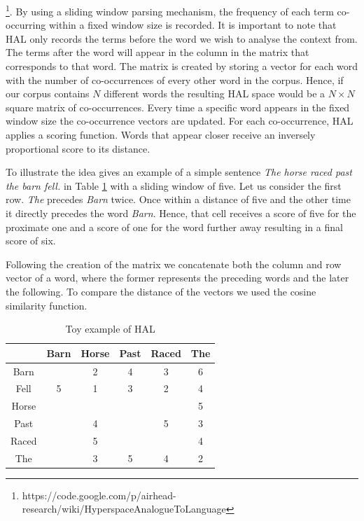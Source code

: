  \footnote{https://code.google.com/p/airhead-research/wiki/HyperspaceAnalogueToLanguage}. By using a sliding window parsing mechanism, the frequency of each term co-occurring within a fixed window size is recorded.  It is important to note that HAL only records the terms before the word we wish to analyse the context from. The terms after the word will appear in the column in the matrix that corresponds to that word.  The matrix is created by storing a vector for each word with the number of co-occurrences of every other word in the corpus. Hence, if our corpus contains $N$ different words the resulting HAL space would be a $N \times N$ square matrix of co-occurrences. Every time a specific word appears in the fixed window size the co-occurrence vectors are updated. For each co-occurrence, HAL applies a scoring function. Words that appear closer receive an inversely proportional score to its distance.

 To illustrate the idea \cite{burgess98} gives an example of a simple sentence \emph {The horse raced past the barn fell.} in Table \ref{tab:halex} with a sliding window of five. Let us consider the first row.  \emph{The} precedes \emph{Barn} twice. Once within a distance of five and the other time it directly precedes the word  \emph{Barn}. Hence, that cell receives a score of five for the proximate one and a score of one for the word further away resulting in a final score of six. 

Following the creation of the matrix we concatenate both the column and row vector of a word, where the former represents the preceding words and the later the following. To compare the distance of the vectors we used the cosine similarity function. 


\begin{table}[H]
\centering
\begin{tabular}{ c c c c c c} \toprule
  & Barn & Horse &  Past & Raced & The \\ 
  \hline
 Barn &  & 2 &  4 & 3 & 6 \\ 
 Fell & 5 & 1 &  3 & 2 & 4 \\ 
 Horse &  &  &   &  & 5 \\ 
 Past &  & 4 &   & 5 & 3 \\ 
 Raced &  & 5 &   &  & 4 \\ 
 The &  & 3 &  5 & 4 & 2 \\ 
   \bottomrule
\end{tabular}
\caption{Toy example of HAL}
\label{tab:halex}
\end{table}





